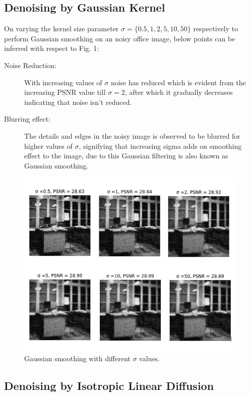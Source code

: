 \documentclass{ipol}
\begin{document}
\subsection{Denoising by Gaussian Kernel}
On varying the kernel size parameter $\sigma = \{0.5, 1, 2, 5, 10, 50\}$ respectively to perform Gaussian smoothing on an noisy office image, below points can be inferred with respect to Fig. 1:
\begin{description}
\item[Noise Reduction:] With increasing values of $\sigma$ noise has reduced which is evident from the increasing PSNR value till $\sigma = 2$, after which it gradually decreases indicating that noise isn't reduced.
\item[Blurring effect:] The details and edges in the noisy image is observed to be blurred for higher values of $\sigma$, signifying that increasing sigma adds on smoothing effect to the image, due to this Gaussian filtering is also known as Gaussian smoothing.
\end{description}
\begin{figure}[!htbp]
\begin{center}
\includegraphics[scale=0.75]{./images/Gaussian_Blur}
\caption{Gaussian smoothing with different $\sigma$ values.}
\label{fig:example}
\end{center}
\end{figure}


\subsection{Denoising by Isotropic Linear Diffusion}
\end{document}
